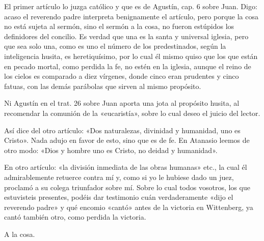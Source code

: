 El primer artículo lo juzga católico y que es de Agustín, cap. 6 sobre Juan. Digo: acaso el reverendo padre interpreta benignamente el artículo, pero porque la cosa no está sujeta al sermón, sino el sermón a la cosa, no fueron estúpidos los definidores del concilio. Es verdad que una es la santa y universal iglesia, pero que sea solo una, como es uno el número de los predestinados, según la inteligencia husita, es heretiquísimo, por lo cual él mismo quiso que los que están en pecado mortal, como perdida la fe, no estén en la iglesia, aunque el reino de los cielos es comparado a diez vírgenes, donde cinco eran prudentes y cinco fatuas, con las demás parábolas que sirven al mismo propósito.

Ni Agustín en el trat. 26 sobre Juan aporta una jota al propósito husita, al recomendar la comunión de la «eucaristía», sobre lo cual deseo el juicio del lector.

Así dice del otro artículo: «Dos naturalezas, divinidad y humanidad, uno es Cristo». Nada adujo en favor de esto, sino que es de fe. En Atanasio leemos de otro modo: «Dios y hombre uno es Cristo, no deidad y humanidad».

En otro artículo: «la división inmediata de las obras humanas» etc., la cual él admirablemente retuerce contra mí y, como si yo le hubiese dado un juez, proclamó a su colega triunfador sobre mí. Sobre lo cual todos vosotros, los que estuvisteis presentes, podéis dar testimonio cuán verdaderamente «dijo el reverendo padre» y qué encomio «cantó» antes de la victoria en Wittenberg, ya cantó también otro, como perdida la victoria.

A la cosa.

